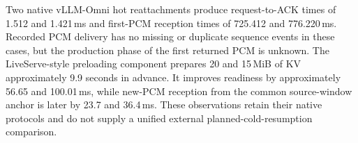 Two native vLLM-Omni hot reattachments \citep{omnidoc} produce
request-to-ACK times of 1.512 and 1.421\,ms and first-PCM reception
times of 725.412 and 776.220\,ms.
Recorded PCM delivery has no missing or duplicate sequence events
in these cases, but the production phase of the first returned PCM
is unknown.
The LiveServe-style preloading component \citep{liveserve2026}
prepares 20 and 15\,MiB of KV approximately 9.9 seconds in advance.
It improves readiness by approximately 56.65 and 100.01\,ms,
while new-PCM reception from the common source-window anchor is
later by 23.7 and 36.4\,ms.
These observations retain their native protocols and do not supply
a unified external planned-cold-resumption comparison.